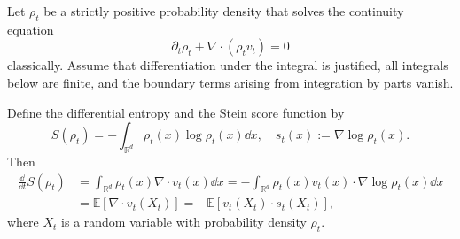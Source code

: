 \documentclass[12pt,a4paper,oneside]{book}
\begin{document}
\begin{theorem}
\label{thm:entropy-evolution}
\label{src:p9q10}
Let $\rho_t$ be a strictly positive probability density that solves the continuity equation
\begin{equation*}
    \partial_t\rho_t+\nabla\cdot(\rho_t v_t)=0
\end{equation*}
classically. Assume that differentiation under the integral is justified, all integrals below are finite, and the boundary 
terms arising from integration by parts vanish.

Define the differential entropy and the Stein score function by
\begin{equation*}
    S(\rho_t)=-\int_{\mathbb R^d}\rho_t(x)\log\rho_t(x)\dd x, \quad s_t(x):=\nabla\log\rho_t(x).
\end{equation*}
Then
\begin{equation*}
    \begin{aligned}
        \frac{\dd}{\dd t}S(\rho_t)
        &= \int_{\mathbb R^d}\rho_t(x)\nabla\cdot v_t(x)\dd x 
         = -\int_{\mathbb R^d} \rho_t(x)v_t(x)\cdot\nabla\log\rho_t(x)\dd x\\
        &= \mathbb E[\nabla\cdot v_t(X_t)] = -\mathbb E[v_t(X_t)\cdot s_t(X_t)],
    \end{aligned}
\end{equation*}
where $X_t$ is a random variable with probability density $\rho_t$.
\end{theorem}
\end{document}

